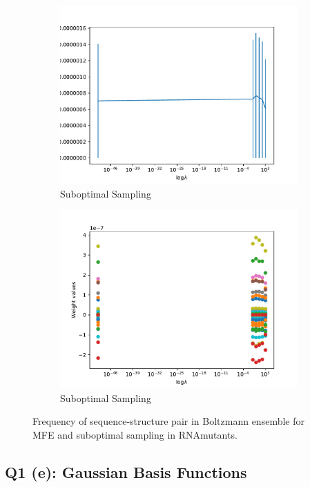 \documentclass[11pt]{amsart}
\begin{document}
\begin{figure}
\begin{subfigure}{0.45\textwidth}
        \includegraphics[width=\textwidth]{q1d_norm.pdf}
        \caption{Suboptimal Sampling}
        \label{fig:ranmutsnomfe_freq}
    \end{subfigure}
    \begin{subfigure}{0.45\textwidth}
        \includegraphics[width=\textwidth]{q1d_weights.pdf}
        \caption{Suboptimal Sampling}
        \label{fig:ranmutsnomfe_freq}
    \end{subfigure}
        \caption{Frequency of sequence-structure pair in Boltzmann ensemble for MFE and suboptimal sampling in RNAmutants.}
    \label{fig:freq}
\end{figure}


\subsection{Q1 (e): Gaussian Basis Functions}
\end{document}
